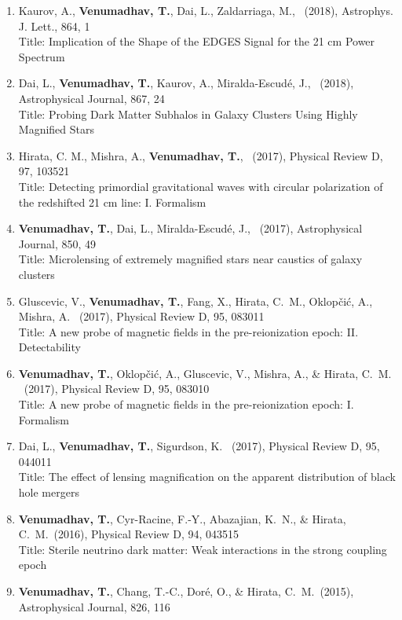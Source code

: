 \documentclass{article}
\newcommand{\apj}{Astrophysical Journal}
\newcommand{\apjl}{Astrophys. J. Lett.}
\newcommand{\prd}{Physical Review D}
\newlength{\cvindent}
\newenvironment{cvblock}{\noindent\hspace*{\cvindent}\begin{minipage}{\dimexpr\textwidth-\cvindent\relax}}{\end{minipage}\par}
\begin{document}
\begin{cvblock}
\begin{enumerate}
	      Title: Heating of the intergalactic medium by the cosmic microwave background during cosmic dawn
               \item Kaurov, A., \textbf{Venumadhav, T.}, Dai, L., Zaldarriaga, M., \ (2018), \apjl, 864, 1 \\
               Title: Implication of the Shape of the EDGES Signal for the 21 cm Power Spectrum
               \item Dai, L., \textbf{Venumadhav, T.}, Kaurov, A., Miralda-Escud\'{e}, J., \ (2018), \apj, 867, 24 \\
               Title: Probing Dark Matter Subhalos in Galaxy Clusters Using Highly Magnified Stars
                \item Hirata, C. M., Mishra, A., \textbf{Venumadhav, T.}, \ (2017), \prd, 97, 103521 \\
                Title: Detecting primordial gravitational waves with circular polarization of the redshifted 21 cm line: I. Formalism               
               \item \textbf{Venumadhav, T.}, Dai, L., Miralda-Escud\'{e}, J., \ (2017), \apj, 850, 49 \\
               Title: Microlensing of extremely magnified stars near caustics of galaxy clusters
	       \item Gluscevic, V., \textbf{Venumadhav, T.}, Fang, X., Hirata, C.~M., Oklop\v{c}i\'{c}, A., Mishra, A. \ (2017), \prd, 95, 083011 \\
	       Title: A new probe of magnetic fields in the pre-reionization epoch: II. Detectability
	       \item \textbf{Venumadhav, T.}, Oklop\v{c}i\'{c}, A., Gluscevic, V., Mishra, A., \& Hirata, C.~M. \ (2017), \prd, 95, 083010 \\
	       Title: A new probe of magnetic fields in the pre-reionization epoch: I. Formalism
	       \item Dai, L., \textbf{Venumadhav, T.}, Sigurdson, K. \ (2017), \prd, 95, 044011 \\
	       Title: The effect of lensing magnification on the apparent distribution of black hole mergers
  	       \item \textbf{Venumadhav, T.}, Cyr-Racine, F.-Y., Abazajian, K.~N., \& Hirata, C.~M.\ (2016), \prd, 94, 043515 \\
    	       Title: Sterile neutrino dark matter: Weak interactions in the strong coupling epoch
               \item \textbf{Venumadhav, T.}, Chang, T.-C., Dor\'{e}, O., \& Hirata, C.~M.\ (2015), \apj, 826, 116 \\

\end{enumerate}
\end{cvblock}
\end{document}
